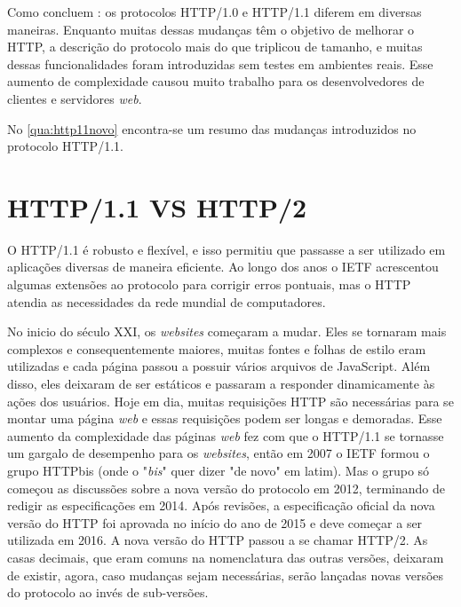 Como concluem : os protocolos HTTP/1.0 e HTTP/1.1 diferem em diversas maneiras. Enquanto muitas dessas mudanças têm o objetivo de melhorar o HTTP, a descrição do protocolo mais do que triplicou de tamanho, e muitas dessas funcionalidades foram introduzidas sem testes em ambientes reais. Esse aumento de complexidade causou muito trabalho para os desenvolvedores de clientes e servidores \textit{web}. 

No \autoref{qua:http11novo} encontra-se um resumo das mudanças introduzidos no protocolo HTTP/1.1.



\section{HTTP/1.1 VS HTTP/2}
\label{sec:http_11_vs_http_2}

O HTTP/1.1 é robusto e flexível, e isso permitiu que passasse a ser utilizado em aplicações diversas de maneira eficiente. Ao longo dos anos o IETF acrescentou algumas extensões ao protocolo para corrigir erros pontuais, mas o HTTP atendia as necessidades da rede mundial de computadores.

No inicio do século XXI, os \textit{websites} começaram a mudar. Eles se tornaram mais complexos e consequentemente maiores, muitas fontes e folhas de estilo eram utilizadas e cada página passou a possuir vários arquivos de JavaScript. Além disso, eles deixaram de ser estáticos e passaram a responder dinamicamente às ações dos usuários. Hoje em dia, muitas requisições HTTP são necessárias para se montar uma página \textit{web} e essas requisições podem ser longas e demoradas. Esse aumento da complexidade das páginas \textit{web} fez com que o HTTP/1.1 se tornasse um gargalo de desempenho para os \textit{websites}, então em 2007 o IETF formou o grupo HTTPbis (onde o "\textit{bis}" quer dizer "de novo" em latim). Mas o grupo só começou as discussões sobre a nova versão do protocolo em 2012, terminando de redigir as especificações em 2014. Após revisões, a especificação oficial da nova versão do HTTP foi aprovada no início do ano de 2015 e deve começar a ser utilizada em 2016. A nova versão do HTTP passou a se chamar HTTP/2. As casas decimais, que eram comuns na nomenclatura das outras versões, deixaram de existir, agora, caso mudanças sejam necessárias, serão lançadas novas versões do protocolo ao invés de sub-versões.

